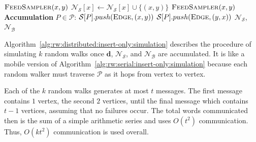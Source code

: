 \documentclass{report}
\newcommand{\push}[1]{\text{push} \left ( #1 \right )}
\newcommand{\algoname}[1]{\textnormal{\textsc{#1}}}
\begin{document}
\begin{algorithm}[htbp]
\begin{flushleft}
\begin{algorithmic}[1]
				\State $\algoname{FeedSampler}(x, y)$
			\ElsIf{$\xi = \algoname{Small}$}
				\State $\mathcal{N}_\mathcal{S}[x] \gets \mathcal{N}_\mathcal{S}[x] \cup \{(x, y)\}$
			\ElsIf{$\xi = \algoname{Big}$}
				\State $\algoname{FeedSampler}(x, y)$
			\EndIf
  		\EndWhile
	\Statex \textbf{Accumulation} $P \in \mathcal{P}$:
			\State $\mathcal{S}[P].push(\algoname{Edge}, (x, y))$
			\State $\mathcal{S}[P].push(\algoname{Edge}, (y, x))$
		\EndFor
		\State \Return $\mathcal{N}_\mathcal{S}$, $\mathcal{N}_\mathcal{B}$
\end{algorithmic}
\end{flushleft}
\end{algorithm}



Algorithm~\ref{alg:rw:distributed:insert-only:simulation} describes the procedure of simulating $k$ random walks once $\mathbf{d}$, $\mathcal{N}_\mathcal{S}$, and $\mathcal{N}_\mathcal{B}$ are accumulated.
It is like a mobile version of Algorithm~\ref{alg:rw:serial:insert-only:simulation} because each random walker must traverse $\mathcal{P}$ as it hops from vertex to vertex.

Each of the $k$ random walks generates at most $t$ messages.
The first message contains $1$ vertex, the second $2$ vertices, until the final message which contains $t-1$ vertices, assuming that no failures occur.
The total words communicated then is the sum of a simple arithmetic series and uses $O(t^2)$ communication.
Thus, $O(kt^2)$ communication is used overall.
\end{document}
